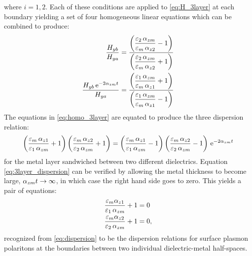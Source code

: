 \documentclass[11pt]{article}
\begin{document}
%
where $i = 1,2$. Each of these conditions are applied to \eqref{eq:H_3layer} at each boundary yielding a set of four homogeneous linear equations which can be combined to produce:
%
\begin{subequations}
  \begin{align}
    \frac{H_{yb}}{H_{ya}} ={}& \frac{\displaystyle \left(\frac{\varepsilon_2 \,\alpha_{zm}}{\varepsilon_m \,\alpha_{z2}} - 1 \right)}{\displaystyle \left(\frac{\varepsilon_2 \,\alpha_{zm}}{\varepsilon_m \,\alpha_{z2}} + 1 \right)}
    \label{eq:homo1_3layer}\\
    \frac{H_{yb} \, \mathrm{e}^{-2 \alpha_{zm}t}}{H_{ya}} ={}& \frac{\displaystyle \left(\frac{\varepsilon_1 \,\alpha_{zm}}{\varepsilon_m \,\alpha_{z1}} + 1 \right)}{\displaystyle \left(\frac{\varepsilon_1 \,\alpha_{zm}}{\varepsilon_m \,\alpha_{z1}} - 1 \right)}
    \label{eq:homo2_3layer}
  \end{align}
  \label{eq:homo_3layer}%
\end{subequations}
%
The equations in \eqref{eq:homo_3layer} are equated to produce the three dispersion relation:
%
\begin{equation}
  \left(\frac{\varepsilon_m \,\alpha_{z1}}{\varepsilon_1 \,\alpha_{zm}} + 1 \right) \left(\frac{\varepsilon_m \,\alpha_{z2}}{\varepsilon_2 \,\alpha_{zm}} + 1 \right) = \left(\frac{\varepsilon_m \,\alpha_{z1}}{\varepsilon_1 \,\alpha_{zm}} - 1 \right) \left(\frac{\varepsilon_m \,\alpha_{z2}}{\varepsilon_2 \,\alpha_{zm}} - 1 \right) \, \mathrm{e}^{-2\alpha_{zm}t}
  \label{eq:3layer_dispersion}
\end{equation}
%
for the metal layer sandwiched between two different dielectrics. Equation \eqref{eq:3layer_dispersion} can be verified by allowing the metal thickness to become large, $\alpha_{zm}t \rightarrow \infty$, in which case the right hand side goes to zero. This yields a pair of equations:
%
\begin{subequations}
  \begin{align}
    \frac{\varepsilon_m \alpha_{z1}}{\varepsilon_1 \,\alpha_{zm}} + 1 ={}& 0
    \label{eq:simplified1_3layer_to2layer}\\
    \frac{\varepsilon_m \alpha_{z2}}{\varepsilon_2 \,\alpha_{zm}} + 1 ={}& 0,
    \label{eq:simplified2_3layer_to2layer}
  \end{align}
  \label{eq:simplified_3layer_to2layer}%
\end{subequations}
%
recognized from \eqref{eq:dispersion} to be the dispersion relations for surface plasmon polaritons at the boundaries between two individual dielectric-metal half-spaces.
\end{document}
